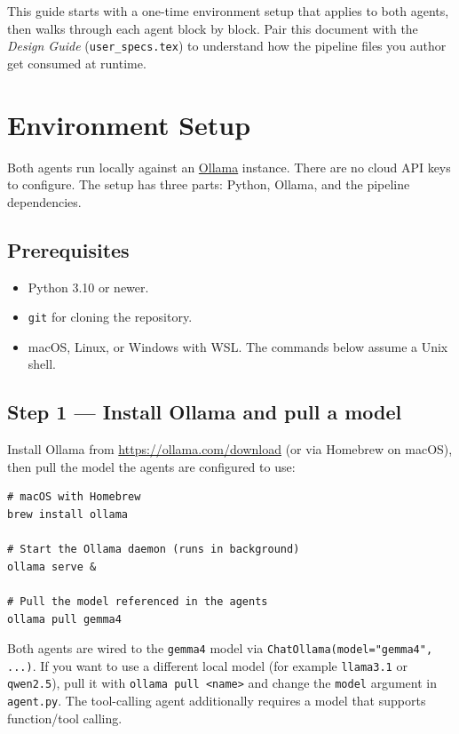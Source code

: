 \documentclass[12pt, a4paper]{article}
\begin{document}
This guide starts with a one-time environment setup that applies to both agents, then walks through each agent block by block. Pair this document with the \textit{Design Guide} (\texttt{user\_specs.tex}) to understand how the pipeline files you author get consumed at runtime.

\section{Environment Setup}

Both agents run locally against an \href{https://ollama.com}{Ollama} instance. There are no cloud API keys to configure. The setup has three parts: Python, Ollama, and the pipeline dependencies.

\subsection{Prerequisites}

\begin{itemize}[leftmargin=1.5em]
  \item Python 3.10 or newer.
  \item \texttt{git} for cloning the repository.
  \item macOS, Linux, or Windows with WSL. The commands below assume a Unix shell.
\end{itemize}

\subsection{Step 1 — Install Ollama and pull a model}

Install Ollama from \url{https://ollama.com/download} (or via Homebrew on macOS), then pull the model the agents are configured to use:

\begin{lstlisting}[style=shellstyle]
# macOS with Homebrew
brew install ollama

# Start the Ollama daemon (runs in background)
ollama serve &

# Pull the model referenced in the agents
ollama pull gemma4
\end{lstlisting}

\begin{notebox}
Both agents are wired to the \texttt{gemma4} model via \texttt{ChatOllama(model="gemma4", ...)}. If you want to use a different local model (for example \texttt{llama3.1} or \texttt{qwen2.5}), pull it with \texttt{ollama pull <name>} and change the \texttt{model} argument in \texttt{agent.py}. The tool-calling agent additionally requires a model that supports function/tool calling.
\end{notebox}
\end{document}
